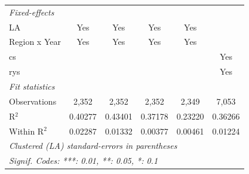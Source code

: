 \begin{table}[htbp]
\begin{tabular}{lccccc}
      \midrule
      \emph{Fixed-effects}\\
      LA                                                     & Yes           & Yes           & Yes          & Yes     & \\  
      Region x Year                                          & Yes           & Yes           & Yes          & Yes     & \\  
      cs                                                     &               &               &              &         & Yes\\  
      rys                                                    &               &               &              &         & Yes\\  
      \midrule
      \emph{Fit statistics}\\
      Observations                                           & 2,352         & 2,352         & 2,352        & 2,349   & 7,053\\  
      R$^2$                                                  & 0.40277       & 0.43401       & 0.37178      & 0.23220 & 0.36266\\  
      Within R$^2$                                           & 0.02287       & 0.01332       & 0.00377      & 0.00461 & 0.01224\\  
      \midrule \midrule
      \multicolumn{6}{l}{\emph{Clustered (LA) standard-errors in parentheses}}\\
      \multicolumn{6}{l}{\emph{Signif. Codes: ***: 0.01, **: 0.05, *: 0.1}}\\
   \end{tabular}
\end{table}



